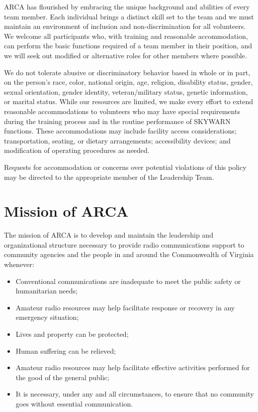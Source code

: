 \documentclass[pdflatex,letterpaper,twoside,12pt]{book}
\begin{document}
ARCA has flourished by embracing the unique background and abilities of every team member.  Each individual brings a distinct skill set to the team and we must maintain an environment of inclusion and non-discrimination for all volunteers.  We welcome all participants who, with training and reasonable accommodation, can perform the basic functions required of a team member in their position, and we will seek out modified or alternative roles for other members where possible.

We do not tolerate abusive or discriminatory behavior based in whole or in part, on the person's race, color, national origin, age, religion, disability status, gender, sexual orientation, gender identity, veteran/military status, genetic information, or marital status.  While our resources are limited, we make every effort to extend reasonable accommodations to volunteers who may have special requirements during the training process and in the routine performance of SKYWARN functions.  These accommodations may include facility access considerations; transportation, seating, or dietary arrangements; accessibility devices; and modification of operating procedures as needed.

Requests for accommodation or concerns over potential violations of this policy may be directed to the appropriate member of the Leadership Team.


\section{Mission of ARCA}

The mission of ARCA is to develop and maintain the leadership and organizational structure necessary to provide radio communications support to community agencies and the people in and around the Commonwealth of Virginia whenever:

\begin{itemize}
	\item Conventional communications are inadequate to meet the public safety or humanitarian needs;
	\item Amateur radio resources may help facilitate response or recovery in any emergency situation;  
	\item Lives and property can be protected;
	\item Human suffering can be relieved;
	\item Amateur radio resources may help facilitate effective activities performed for the good of the general public;  
	\item It is necessary, under any and all circumstances, to ensure that no community goes without essential communication.
\end{itemize}
\end{document}
